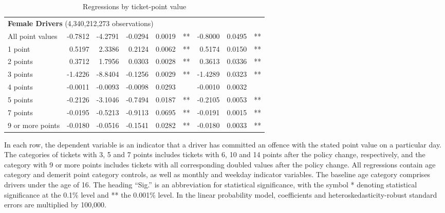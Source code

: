 \begin{table}
\begin{tabular}{l r r r r l r r l}
\hline 

\multicolumn{8}{l}{\textbf{Female Drivers} (4,340,212,273 observations)} \\ 

All point values                &  -0.7812        &  -4.2791       &  -0.0294        &  0.0019       &   **       &  -0.8000        &  0.0495       &   **       \\ 
1 point                         &  0.5197        &  2.3386       &  0.2124        &  0.0062       &   **       &  0.5174        &  0.0150       &   **       \\ 
2 points                        &  0.3712        &  1.7956       &  0.0303        &  0.0028       &   **       &  0.3613        &  0.0336       &   **       \\ 
3 points                        &  -1.4226        &  -8.8404       &  -0.1256        &  0.0029       &   **       &  -1.4289        &  0.0323       &   **       \\ 
4 points                        &  -0.0011        &  -0.0093       &  -0.0098        &  0.0293       &            &  -0.0010        &  0.0032       &            \\ 
5 points                        &  -0.2126        &  -3.1046       &  -0.7494        &  0.0187       &   **       &  -0.2105        &  0.0053       &   **       \\ 
7 points                        &  -0.0195        &  -0.5213       &  -0.9113        &  0.0695       &   **       &  -0.0191        &  0.0015       &   **       \\ 
9 or more points                &  -0.0180        &  -0.0516       &  -0.1541        &  0.0282       &   **       &  -0.0180        &  0.0033       &   **       \\ 

\hline 

\end{tabular} 
\caption{Regressions by ticket-point value} 
In each row, the dependent variable is an indicator that a driver has committed  
an offence with the stated point value on a particular day.  
The categories of tickets with 3, 5 and 7 points includes tickets  
with 6, 10 and 14 points after the policy change, respectively,  
and the category with 9 or more points includes tickets  
with all corresponding doubled values after the policy change. 
All regressions contain age category and demerit point category controls, 
as well as monthly and weekday indicator variables. 
The baseline age category comprises drivers under the age of 16. 
The heading ``Sig.'' is an abbreviation for statistical significance, with 
the symbol * denoting statistical significance at the 0.1\% level 
and ** the 0.001\% level. 
In the linear probability model, coefficients and heteroskedasticity-robust standard errors are  
multiplied by 100,000.  
\label{tab:seas_Logit_vs_LPMx100K_regs_by_points} 
\end{table} 
 
